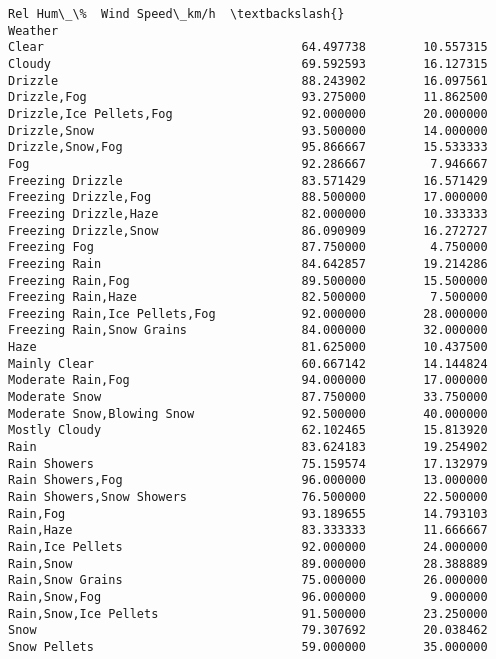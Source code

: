 \documentclass[11pt]{article}
\begin{document}
\begin{tcolorbox}[breakable, size=fbox, boxrule=.5pt, pad at break*=1mm, opacityfill=0]
\begin{Verbatim}[commandchars=\\\{\}]
                                         Rel Hum\_\%  Wind Speed\_km/h  \textbackslash{}
Weather
Clear                                    64.497738        10.557315
Cloudy                                   69.592593        16.127315
Drizzle                                  88.243902        16.097561
Drizzle,Fog                              93.275000        11.862500
Drizzle,Ice Pellets,Fog                  92.000000        20.000000
Drizzle,Snow                             93.500000        14.000000
Drizzle,Snow,Fog                         95.866667        15.533333
Fog                                      92.286667         7.946667
Freezing Drizzle                         83.571429        16.571429
Freezing Drizzle,Fog                     88.500000        17.000000
Freezing Drizzle,Haze                    82.000000        10.333333
Freezing Drizzle,Snow                    86.090909        16.272727
Freezing Fog                             87.750000         4.750000
Freezing Rain                            84.642857        19.214286
Freezing Rain,Fog                        89.500000        15.500000
Freezing Rain,Haze                       82.500000         7.500000
Freezing Rain,Ice Pellets,Fog            92.000000        28.000000
Freezing Rain,Snow Grains                84.000000        32.000000
Haze                                     81.625000        10.437500
Mainly Clear                             60.667142        14.144824
Moderate Rain,Fog                        94.000000        17.000000
Moderate Snow                            87.750000        33.750000
Moderate Snow,Blowing Snow               92.500000        40.000000
Mostly Cloudy                            62.102465        15.813920
Rain                                     83.624183        19.254902
Rain Showers                             75.159574        17.132979
Rain Showers,Fog                         96.000000        13.000000
Rain Showers,Snow Showers                76.500000        22.500000
Rain,Fog                                 93.189655        14.793103
Rain,Haze                                83.333333        11.666667
Rain,Ice Pellets                         92.000000        24.000000
Rain,Snow                                89.000000        28.388889
Rain,Snow Grains                         75.000000        26.000000
Rain,Snow,Fog                            96.000000         9.000000
Rain,Snow,Ice Pellets                    91.500000        23.250000
Snow                                     79.307692        20.038462
Snow Pellets                             59.000000        35.000000

\end{Verbatim}
\end{tcolorbox}
\end{document}
